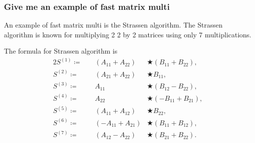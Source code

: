 \documentclass[aspectratio=169, t]{beamer}
\def\block#1#2{_{#1#2}}
\def\series#1{^{(#1)}}
\def\A{A\block}
\def\B{B\block}
\def\C{C\block}
\def\S{S\series}
\begin{document}
\begin{frame}
	\frametitle{Give me an example of fast matrix multi}

	An example of fast matrix multi is the Strassen algorithm.
	The Strassen algorithm is known for multiplying 2 2 by 2
	matrices using only 7 multiplications.

	\pause

	The formula for Strassen algorithm is
	\def\={\coloneqq}
	\def\*{\bigstar}
	\begin{alignat*}{2}
        \S1    \= &&    (\A11 + \A22)  & \*   (\B11 + \B22),  \\
        \S2    \= &&    (\A21 + \A22)  & \*        \B11    ,  \\
        \S3    \= &&         \A11      & \*   (\B12 - \B22),  \\
        \S4    \= &&         \A22      & \*  (-\B11 + \B21),  \\
        \S5    \= &&    (\A11 + \A12)  & \*        \B22    ,  \\
        \S6    \= &&   (-\A11 + \A21)  & \*   (\B11 + \B12),  \\
        \S7    \=&\;&   (\A12 - \A22)  & \*   (\B21 + \B22).    
	\end{alignat*}
\end{frame}

\end{document}
